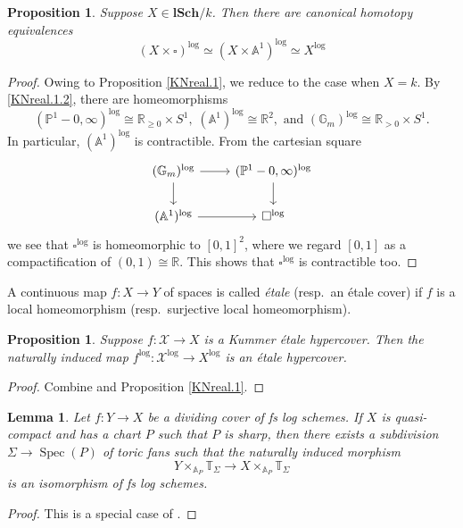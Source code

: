 \documentclass[11pt, a4paper]{amsart}
\newtheorem{prop}[thm]{Proposition}
\newtheorem{lem}[thm]{Lemma}
\theoremstyle{definition}
\numberwithin{equation}{subsection}
\newcommand{\R}{\mathbb{R}}
\renewcommand{\P}{\mathbb{P}}
\newcommand{\A}{\mathbb{A}}
\newcommand{\G}{{\mathbb{G}}}
\newcommand{\T}{\mathbb{T}}
\newcommand{\lSch}{\mathbf{lSch}}
\providecommand{\Spec}[1]{\operatorname{Spec}(#1)} 	%
\newcommand{\sX}{\mathscr{X}}
\newcommand{\boxx}{\square}
\begin{document}
\begin{prop}
\label{KNreal.2}
Suppose $X\in \lSch/k$.
Then there are canonical homotopy equivalences
\[
(X\times \boxx)^{\log}
\simeq
(X\times \A^1)^{\log}
\simeq
X^{\log}
\]
\end{prop}
\begin{proof}
Owing to Proposition \ref{KNreal.1},
we reduce to the case when $X=k$.
By \eqref{KNreal.1.2},
there are homeomorphisms
\[
(\P^1-0,\infty)^{\log}\cong \R_{\geq 0}\times S^1,
\;
(\A^1)^{\log} \cong \R^2,
\text{ and }
(\mathbb{G}_m)^{\log} \cong \R_{>0}\times S^1.
\]
In particular, $(\A^1)^{\log}$ is contractible.
From the cartesian square
\[
\begin{tikzcd}
(\G_m)^{\log}\ar[d]\ar[r]&
(\P^1-0,\infty)^{\log}\ar[d]
\\
(\A^1)^{\log}\ar[r]&
\boxx^{\log}
\end{tikzcd}
\]
we see that $\boxx^{\log}$ is homeomorphic to $[0,1]^2$,
where we regard $[0,1]$ as a compactification of $(0,1)\cong \R$.
This shows that $\boxx^{\log}$ is contractible too.
\end{proof}

A continuous map $f\colon X\to Y$ of spaces is called \emph{\'etale} (resp.\ an \'etale cover) 
if $f$ is a local homeomorphism (resp.\ surjective local homeomorphism).

\begin{prop}
\label{KNreal.3}
Suppose $f\colon \sX\to X$ is a Kummer \'etale hypercover.
Then the naturally induced map $f^{\log}\colon \sX^{\log}\to X^{\log}$ is an \'etale hypercover.
\end{prop}
\begin{proof}
Combine \cite[Lemma 2.2]{MR1700591} and Proposition \ref{KNreal.1}.
\end{proof}


\begin{lem}
\label{logtop.7}
Let $f\colon Y\to X$ be a dividing cover of fs log schemes.
If $X$ is quasi-compact and has a chart $P$ such that $P$ is sharp, then there exists a subdivision $\Sigma\to \Spec{P}$ of toric fans such that the naturally induced morphism
\[
Y\times_{\A_P}\T_\Sigma\to X\times_{\A_P}\T_{\Sigma}
\]
is an isomorphism of fs log schemes.
\end{lem}
\begin{proof}
This is a special case of \cite[Proposition A.11.5]{logDM}.
\end{proof}
\end{document}

